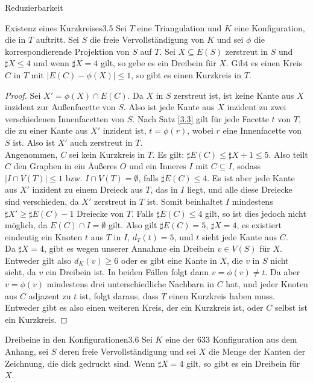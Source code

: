 \begin{section}{Reduzierbarkeit}
 \begin{satzl}{Existenz eines Kurzkreises}{3.5}
  Sei $T$ eine Triangulation und $K$ eine Konfiguration, die in $T$ auftritt. Sei $S$ die freie Vervollständigung von $K$ und sei $\phi$ die korrespondierende Projektion von $S$ auf $T$. Sei $X \subseteq E(S)$ zerstreut in $S$ und $\sharp X \leq 4$ und wenn $\sharp X = 4$ gilt, so gebe es ein Dreibein für $X$. Gibt es einen Kreis $C$ in $T$ mit $|E(C) - \phi(X)| \leq 1$, so gibt es einen Kurzkreis in $T$.
 \end{satzl}
 \begin{proof}
  Sei $X' = \phi(X) \cap E(C)$. Da $X$ in $S$ zerstreut ist, ist keine Kante aus $X$ inzident zur Außenfacette von $S$. Also ist jede Kante aus $X$ inzident zu zwei verschiedenen Innenfacetten von $S$. Nach Satz \ref{3.3} gilt für jede Facette $t$ von $T$, die zu einer Kante aus $X'$ inzident ist, $t=\phi(r)$, wobei $r$ eine Innenfacette von $S$ ist. Also ist $X'$ auch zerstreut in $T$.\\
  Angenommen, $C$ sei kein Kurzkreis in $T$. Es gilt: $\sharp E(C) \leq \sharp X +1 \leq 5$. Also teilt $C$ den Graphen in ein Äußeres $O$ und ein Inneres $I$ mit $C \subseteq I$, sodass $|I \cap V(T)| \leq 1$ bzw. $I \cap V(T) = \emptyset$, falls $\sharp E(C) \leq 4$. Es ist aber jede Kante aus $X'$ inzident zu einem Dreieck aus $T$, das in $I$ liegt, und alle diese Dreiecke sind verschieden, da $X'$ zerstreut in $T$ ist. Somit beinhaltet $I$ mindestens $\sharp X' \geq \sharp E(C) -1$ Dreiecke von $T$. Falls $\sharp E(C) \leq 4$ gilt, so ist dies jedoch nicht möglich, da $E(C) \cap I = \emptyset$ gilt. Also gilt $\sharp E(C) = 5$, $\sharp X = 4$, es existiert eindeutig ein Knoten $t$ aus $T$ in $I$, $d_T(t) = 5$, und $t$ sieht jede Kante aus $C$.\\
  Da $\sharp X = 4$, gibt es wegen unserer Annahme ein Dreibein $v\in V(S)$ für $X$. Entweder gilt also $d_K(v) \geq 6$ oder es gibt eine Kante in $X$, die $v$ in $S$ nicht sieht, da $v$ ein Dreibein ist. In beiden Fällen folgt dann $v=\phi(v)\neq t$. Da aber $v=\phi(v)$ mindestens drei unterschiedliche Nachbarn in $C$ hat, und jeder Knoten aus $C$ adjazent zu $t$ ist, folgt daraus, dass $T$ einen Kurzkreis haben muss. \\
  Entweder gibt es also einen weiteren Kreis, der ein Kurzkreis ist, oder $C$ selbst ist ein Kurzkreis.
 \end{proof}
 
 \begin{satzl}{Dreibeine in den Konfigurationen}{3.6}
  Sei $K$ eine der 633 Konfiguration aus dem Anhang, sei $S$ deren freie Vervollständigung und sei $X$ die Menge der Kanten der Zeichnung, die dick gedruckt sind. Wenn $\sharp X = 4$ gilt, so gibt es ein Dreibein für $X$.
 \end{satzl}
 

\end{section}
